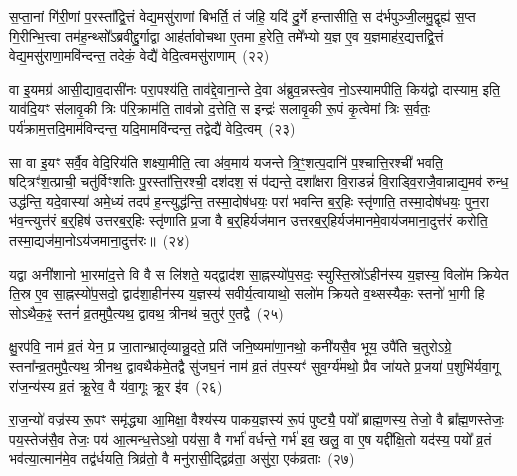 स॒प्ता॒नां गि॑री॒णां प॒रस्ता᳚द्वि॒त्तं वेद्य॒मसु॑राणां बिभर्ति॒ तं ज॑हि॒ यदि॑ दु॒र्गे हन्तासीति॒ स द॑र्भपुञ्जी॒लमु॒द्वृह्य॑ स॒प्त गि॒रीन्भि॒त्त्वा तम॑ह॒न्थ्सो᳚\-ऽब्रवीद्दु॒र्गाद्वा आह॑र्तावोचथा ए॒तमा ह॒रेति॒ तमे᳚भ्यो य॒ज्ञ ए॒व य॒ज्ञमाह॑र॒द्यत्तद्वि॒त्तं वेद्य॒मसु॑राणा॒मवि॑न्दन्त॒ तदेकं॒ वेद्यै॑ वेदि॒त्वमसु॑राणाम्~(२२)\ip

वा इ॒यमग्र॑ आसी॒द्याव॒दासी॑नः परा॒पश्य॑ति॒ ताव॑द्दे॒वाना॒न्ते दे॒वा अ॑ब्रुव॒न्नस्त्वे॒व नो॒\-ऽस्यामपीति॒ किय॑द्वो दास्याम॒ इति॒ याव॑दि॒यꣳ स॑लावृ॒की त्रिः प॑रि॒क्राम॑ति॒ ताव॑न्नो द॒त्तेति॒ स इन्द्रः॑ सलावृ॒की रू॒पं कृ॒त्वेमां त्रिः स॒र्वतः॒ पर्य॑क्राम॒त्तदि॒माम॑विन्दन्त॒ यदि॒मामवि॑न्दन्त॒ तद्वेद्यै॑ वेदि॒त्वम्~(२३)\ip

सा वा इ॒यꣳ सर्वै॒व वेदि॒रिय॑ति शक्ष्या॒मीति॒ त्वा अ॑व॒माय॑ यजन्ते त्रि॒ꣳ॒शत्प॒दानि॑ प॒श्चात्ति॒रश्ची॑ भवति॒ षट्त्रिꣳ॑श॒त्प्राची॒ चतु॑र्विꣳशतिः पु॒रस्ता᳚त्ति॒रश्ची॒ दश॑दश॒ सं प॑द्यन्ते॒ दशा᳚क्षरा वि॒राडन्नं॑ वि॒राड्वि॒राजै॒वान्नाद्य॒मव॑ रुन्ध॒ उद्ध॑न्ति॒ यदे॒वास्या॑ अमे॒ध्यं तदप॑ ह॒न्त्युद्ध॑न्ति॒ तस्मा॒दोष॑धयः॒ परा॑ भवन्ति ब॒र्॒\mbox{}हिः स्तृ॑णाति॒ तस्मा॒दोष॑धयः॒ पुन॒रा भ॑व॒न्त्युत्त॑रं ब॒र्॒\mbox{}हिष॑ उत्तरब॒र्॒\mbox{}हिः स्तृ॑णाति प्र॒जा वै ब॒र्॒\mbox{}हिर्यज॑मान उत्तरब॒र्॒\mbox{}हिर्यज॑मानमे॒वाय॑जमाना॒दुत्त॑रं करोति॒ तस्मा॒द्यज॑मा॒नो\-ऽय॑जमाना॒दुत्त॑रः॥~(२४)\ip

{}

यद्वा अनी॑शानो भा॒रमा॑द॒त्ते वि वै स लि॑शते॒ यद्द्वाद॑श सा॒ह्नस्यो॑प॒सदः॒ स्युस्ति॒स्रो॑\-ऽहीन॑स्य य॒ज्ञस्य॒ विलो॑म क्रियेत ति॒स्र ए॒व सा॒ह्नस्यो॑प॒सदो॒ द्वाद॑शा॒हीन॑स्य य॒ज्ञस्य॑ सवीर्य॒त्वायाथो॒ सलो॑म क्रियते व॒थ्सस्यैकः॒ स्तनो॑ भा॒गी हि सो\-ऽथैक॒ꣴ॒ स्तनं॑ व्र॒तमुपै॒त्यथ॒ द्वावथ॒ त्रीनथ॑ च॒तुर॑ ए॒तद्वै~(२५)\ip

क्षु॒रप॑वि॒ नाम॑ व्र॒तं येन॒ प्र जा॒तान्भ्रातृ॑व्यान्नु॒दते॒ प्रति॑ जनि॒ष्यमा॑णा॒नथो॒ कनी॑यसै॒व भूय॒ उपै॑ति च॒तुरो\-ऽग्रे॒ स्तना᳚न्व्र॒तमुपै॒त्यथ॒ त्रीनथ॒ द्वावथैक॑मे॒तद्वै सु॑जघ॒नं नाम॑ व्र॒तं त॑प॒स्यꣳ॑ सुव॒र्ग्य॑मथो॒ प्रैव जा॑यते प्र॒जया॑ प॒शुभि॑र्यवा॒गू रा॑ज॒न्य॑स्य व्र॒तं क्रू॒रेव॒ वै य॑वा॒गूः क्रू॒र इ॑व~(२६)\ip

रा॒ज॒न्यो॑ वज्र॑स्य रू॒पꣳ समृ॑द्ध्या आ॒मिक्षा॒ वैश्य॑स्य पाकय॒ज्ञस्य॑ रू॒पं पुष्ट्यै॒ पयो᳚ ब्राह्म॒णस्य॒ तेजो॒ वै ब्रा᳚ह्म॒णस्तेजः॒ पय॒स्तेज॑सै॒व तेजः॒ पय॑ आ॒त्मन्ध॒त्ते\-ऽथो॒ पय॑सा॒ वै गर्भा॑ वर्धन्ते॒ गर्भ॑ इव॒ खलु॒ वा ए॒ष यद्दी᳚क्षि॒तो यद॑स्य॒ पयो᳚ व्र॒तं भव॑त्या॒त्मान॑मे॒व तद्व॑र्धयति॒ त्रिव्र॑तो॒ वै मनु॑रासी॒द्द्विव्र॑ता॒ असु॑रा॒ एक॑व्रताः~(२७)\ip

